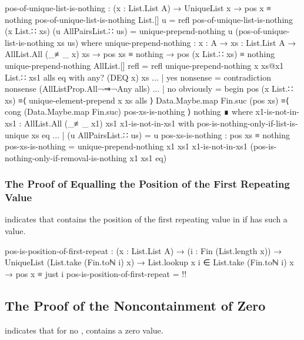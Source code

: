 \documentclass{report}
\begin{document}
\begin{code}
    pos-of-unique-list-is-nothing :
      (x : List.List A) →
      UniqueList x →
      pos x ≡ nothing
    pos-of-unique-list-is-nothing List.[] u = refl
    pos-of-unique-list-is-nothing (x List.∷ xs) (u AllPairsList.∷ us) =
      unique-prepend-nothing u (pos-of-unique-list-is-nothing xs us)
      where
      unique-prepend-nothing :
        {x : A} →
        {xs : List.List A} →
        AllList.All (_≢_ x) xs →
        pos xs ≡ nothing →
        pos (x List.∷ xs) ≡ nothing
      unique-prepend-nothing AllList.[] refl = refl
      unique-prepend-nothing {x} xs@{x1 List.∷ xs1} alls eq with any? (DEQ x) xs
      ... | yes nonsense = contradiction nonsense (AllListProp.All¬⇒¬Any alls)
      ... | no obviously = begin
        pos (x List.∷ xs)
          ≡⟨ unique-element-prepend x xs alls ⟩
        Data.Maybe.map Fin.suc (pos xs)
          ≡⟨ cong (Data.Maybe.map Fin.suc) pos-xs-is-nothing ⟩
        nothing ∎
        where
        x1-is-not-in-xs1 : AllList.All (_≢_ x1) xs1
        x1-is-not-in-xs1 with pos-is-nothing-only-if-list-is-unique xs eq
        ... | (u AllPairsList.∷ us) = u
        pos-xs-is-nothing : pos xs ≡ nothing
        pos-xs-is-nothing =
          unique-prepend-nothing {x1} {xs1}
                                 x1-is-not-in-xs1
                                 (pos-is-nothing-only-if-removal-is-nothing {x1} {xs1} eq)
\end{code}

\subsubsection{The Proof of Equalling the Position of the First Repeating Value}
 indicates that   contains the position of the first repeating value in  if  has such a value.

\begin{code}
    pos-is-position-of-first-repeat :
      (x : List.List A) →
      (i : Fin (List.length x)) →
      UniqueList (List.take (Fin.toℕ i) x) →
      List.lookup x i ∈ List.take (Fin.toℕ i) x →
      pos x ≡ just i
    pos-is-position-of-first-repeat = {!!}
\end{code}

\subsection{The Proof of the Noncontainment of Zero}
 indicates that for no ,   contains a zero value.
\end{document}
